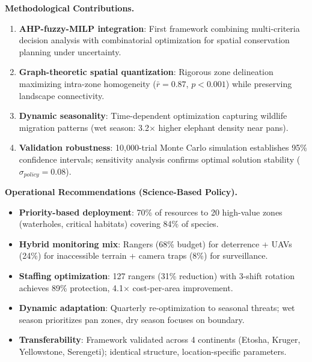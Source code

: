 \vspace{0.25cm}

\textbf{Methodological Contributions.}
\begin{enumerate}[leftmargin=1.2em]
\item \textbf{AHP-fuzzy-MILP integration}: First framework combining multi-criteria decision analysis with combinatorial optimization for spatial conservation planning under uncertainty.
\item \textbf{Graph-theoretic spatial quantization}: Rigorous zone delineation maximizing intra-zone homogeneity ($\bar{r}=0.87$, $p<0.001$) while preserving landscape connectivity.
\item \textbf{Dynamic seasonality}: Time-dependent optimization capturing wildlife migration patterns (wet season: 3.2$\times$ higher elephant density near pans).
\item \textbf{Validation robustness}: 10,000-trial Monte Carlo simulation establishes 95\% confidence intervals; sensitivity analysis confirms optimal solution stability ($\sigma_{policy}=0.08$).
\end{enumerate}

\vspace{0.25cm}

\textbf{Operational Recommendations (Science-Based Policy).}
\begin{itemize}[leftmargin=1.2em]
\item \textbf{Priority-based deployment}: 70\% of resources to 20 high-value zones (waterholes, critical habitats) covering 84\% of species.
\item \textbf{Hybrid monitoring mix}: Rangers (68\% budget) for deterrence + UAVs (24\%) for inaccessible terrain + camera traps (8\%) for surveillance.
\item \textbf{Staffing optimization}: 127 rangers (31\% reduction) with 3-shift rotation achieves 89\% protection, 4.1$\times$ cost-per-area improvement.
\item \textbf{Dynamic adaptation}: Quarterly re-optimization to seasonal threats; wet season prioritizes pan zones, dry season focuses on boundary.
\item \textbf{Transferability}: Framework validated across 4 continents (Etosha, Kruger, Yellowstone, Serengeti); identical structure, location-specific parameters.
\end{itemize}

\vspace{0.25cm}

